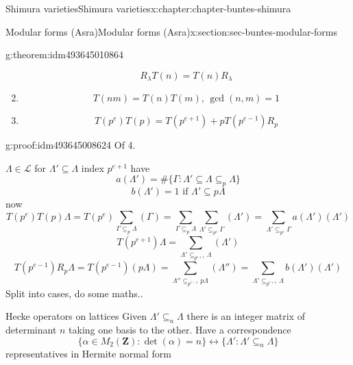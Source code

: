 \documentclass[oneside,10pt,]{book}
\numberwithin{equation}{section}
\newcommand{\ZZ}{\mathbf{Z}}
\begin{document}
\begin{chapterptx}{Shimura varieties}{}{Shimura varieties}{}{}{x:chapter:chapter-buntes-shimura}
\begin{sectionptx}{Modular forms (Asra)}{}{Modular forms (Asra)}{}{}{x:section:sec-buntes-modular-forms}
\begin{theorem}{}{}{g:theorem:idm493645010864}
\begin{enumerate}
\begin{equation*}
R_\lambda T(n) = T(n) R_{\lambda}
\end{equation*}
%
\item{}%
\begin{equation*}
T(nm) = T(n) T(m),\,\gcd(n,m) =1
\end{equation*}
%
\item{}%
\begin{equation*}
T(p^e)T(p) = T(p^{e+1 }) + p T(p^{e-1}) R_p
\end{equation*}
%
\end{enumerate}
%
\end{theorem}
\begin{proofptx}{}{g:proof:idm493645008624}
Of 4.%
\par
\(\Lambda \in \mathcal L\) for \(\Lambda' \subseteq \Lambda \) index \(p^{e+1}\) have%
\begin{equation*}
a(\Lambda')  = \# \{ \Gamma : \Lambda'  \subseteq \Lambda \subseteq_p \Lambda \}
\end{equation*}
%
\begin{equation*}
b(\Lambda')  = 1 \text{ if } \Lambda' \subseteq p\Lambda
\end{equation*}
now%
\begin{equation*}
T(p^e)T(p) \Lambda = T(p^e) \sum_{\Gamma \subseteq_p \Lambda } (\Gamma) = \sum_{\Gamma \subseteq_p \Lambda } \sum_{\Lambda' \subseteq_{p^e} \Gamma} (\Lambda') =\sum_{\Lambda' \subseteq_{p^e} \Gamma}  a(\Lambda') (\Lambda')
\end{equation*}
%
\begin{equation*}
T(p^{e+1} ) \Lambda  =  \sum_{\Lambda'\subseteq_{p^{e+1}} \Lambda} (\Lambda')
\end{equation*}
%
\begin{equation*}
T(p^{e-1} )R_p \Lambda  =  T(p^{e-1}) (p \Lambda) = \sum_{\Lambda'' \subseteq_{p^{e-1}} p\Lambda } (\Lambda'') = \sum_{\Lambda' \subseteq_{p^{e+1}} \Lambda} b(\Lambda') (\Lambda')
\end{equation*}
Split into cases, do some maths..%
\end{proofptx}
Hecke operators on lattices Given \(\Lambda' \subseteq_n \Lambda\) there is an integer matrix of determinant  \(n\) taking one basis to the other. Have a correspondence%
\begin{equation*}
\{ \alpha \in M_2(\ZZ) : \det(\alpha) = n \}  \leftrightarrow \{ \Lambda ' : \Lambda ' \subseteq_n \Lambda\}
\end{equation*}
representatives in Hermite normal form%

\end{sectionptx}
\end{chapterptx}
\end{document}
